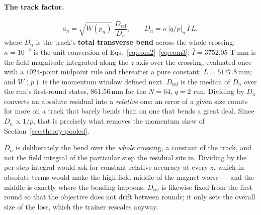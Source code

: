 \documentclass[11pt,a4paper]{article}
\newcommand{\mm}{\ensuremath{\,\mathrm{mm}}}
\begin{document}
\paragraph{The track factor.}
%
\begin{equation}
  a_n = \sqrt{W(p_n)}\;\frac{D_{\mathrm{ref}}}{D_n},
  \qquad
  D_n = \kappa\,\left|q/p\right|_n\,\bar{I}\,L,
  \label{eq:track}
\end{equation}
%
where $D_n$ is the track's \textbf{total transverse bend} across the whole
crossing; $\kappa = 10^{-3}$ is the unit conversion of
Eqs.~\eqref{eq:eom2}--\eqref{eq:eom3}; $\bar{I} = 3752.05$ T$\cdot$mm is the
field magnitude integrated along the $z$ axis over the crossing, evaluated once
with a $1024$-point midpoint rule and thereafter a pure constant;
$L = 5177.8\mm$; and $W(p)$ is the momentum window defined next.
$D_{\mathrm{ref}}$ is the median of $D_n$ over the run's first-round states,
$861.56\mm$ for the $N = 64$, $q = 2$ run. Dividing by $D_n$ converts an
absolute residual into a \emph{relative} one: an error of a given size counts
for more on a track that barely bends than on one that bends a great deal.
Since $D_n \propto 1/p$, that is precisely what removes the momentum skew of
Section~\ref{sec:theory-pooled}.

$D_n$ is deliberately the bend over the \emph{whole} crossing, a constant of
the track, and not the field integral of the particular step the residual sits
in. Dividing by the per-step integral would ask for constant relative accuracy
at every $z$, which in absolute terms would make the high-field middle of the
magnet worse --- and the middle is exactly where the bending happens.
$D_{\mathrm{ref}}$ is likewise fixed from the first round so that the objective
does not drift between rounds; it only sets the overall size of the loss, which
the trainer rescales anyway.
\end{document}
